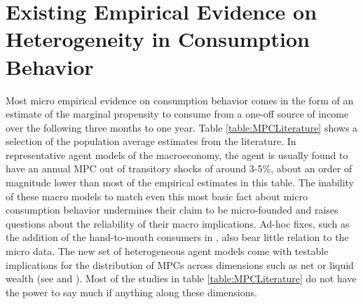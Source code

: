 \documentclass[titlepage]{\econtex}\newcommand{\texname}{ConsumptionHeterogeneity}
\begin{document}
\section{Existing Empirical Evidence on Heterogeneity in Consumption Behavior} \label{MPCEmpirics}
Most micro empirical evidence on consumption behavior comes in the form of an estimate of the marginal propensity to consume from a one-off source of income over the following three months to one year. Table \ref{table:MPCLiterature} shows a selection of the population average estimates from the literature. In representative agent models of the macroeconomy, the agent is usually found to have an annual MPC out of transitory shocks of around 3-5\%, about an order of magnitude lower than most of the empirical estimates in this table. The inability of these macro models to match even this most basic fact about micro consumption behavior undermines their claim to be micro-founded and raises questions about the reliability of their macro implications. Ad-hoc fixes, such as the addition of the hand-to-mouth consumers in \cite{campbell_consumption_1989}, also bear little relation to the micro data. The new set of heterogeneous agent models come with testable implications for the distribution of MPCs across dimensions such as net or liquid wealth (see \cite{carroll_distribution_2017} and \cite{violante_wealthy_2014}). Most of the studies in table \ref{table:MPCLiterature} do not have the power to say much if anything along these dimensions.
\end{document}

